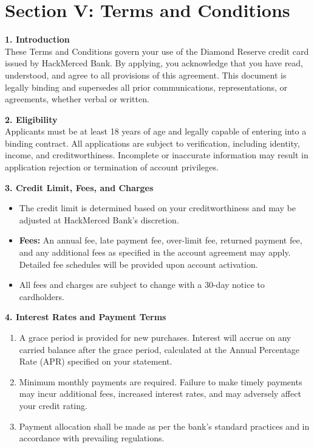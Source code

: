 \documentclass[12pt,a4paper]{article}
\begin{document}
\newpage

\section*{Section V: Terms and Conditions}
\begin{spacing}{1.1}
\textbf{1. Introduction}\\[1ex]
These Terms and Conditions govern your use of the Diamond Reserve credit card issued by HackMerced Bank. By applying, you acknowledge that you have read, understood, and agree to all provisions of this agreement. This document is legally binding and supersedes all prior communications, representations, or agreements, whether verbal or written.

\vspace{1em}
\textbf{2. Eligibility}\\[1ex]
Applicants must be at least 18 years of age and legally capable of entering into a binding contract. All applications are subject to verification, including identity, income, and creditworthiness. Incomplete or inaccurate information may result in application rejection or termination of account privileges.

\vspace{1em}
\textbf{3. Credit Limit, Fees, and Charges}\\[1ex]
\begin{itemize}
    \item The credit limit is determined based on your creditworthiness and may be adjusted at HackMerced Bank’s discretion.
    \item \textbf{Fees:} An annual fee, late payment fee, over-limit fee, returned payment fee, and any additional fees as specified in the account agreement may apply. Detailed fee schedules will be provided upon account activation.
    \item All fees and charges are subject to change with a 30-day notice to cardholders.
\end{itemize}

\vspace{1em}
\textbf{4. Interest Rates and Payment Terms}\\[1ex]
\begin{enumerate}[label*=\arabic*.]
    \item A grace period is provided for new purchases. Interest will accrue on any carried balance after the grace period, calculated at the Annual Percentage Rate (APR) specified on your statement.
    \item Minimum monthly payments are required. Failure to make timely payments may incur additional fees, increased interest rates, and may adversely affect your credit rating.
    \item Payment allocation shall be made as per the bank’s standard practices and in accordance with prevailing regulations.
\end{enumerate}


\end{spacing}
\end{document}
